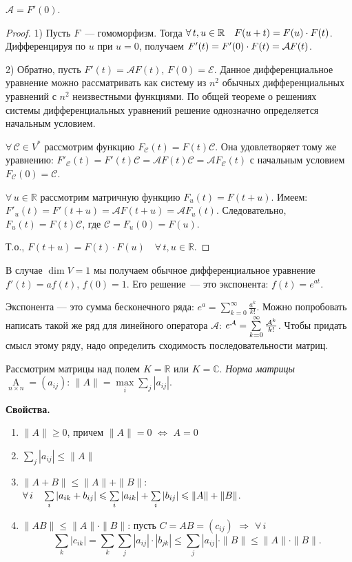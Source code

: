 \documentclass[a4paper]{article}
\newcommand{\svoy}{\vspace{5pt}\noindent\textbf{Свойства.}\vspace{-6pt}}
\newcommand*{\p}[1]{#1\nobreak\discretionary{}{\hbox{$\mathsurround=0pt #1$}}{}}
\begin{document}
\begin{zam}
$\mathcal{A}=F'(0)$.
\end{zam}

\begin{proof}
1) Пусть $F$~--- гомоморфизм. Тогда $\forall \,
t,u\in\mathbb{R}\quad F(u\p+t)=F(u)\cdot F(t)$. Дифференцируя по $u$
при $u=0$, получаем $F'(t)\p=F'(0)\cdot F(t)=\mathcal{A} F(t)$.

2) Обратно, пусть $F'(t)=\mathcal{A}F(t)$, $F(0)=\mathcal{E}$.
Данное дифференциальное уравнение можно рассматривать как систему из
$n^2$ обычных дифференциальных уравнений с $n^2$ неизвестными
функциями. По общей теореме о решениях системы дифференциальных
уравнений решение однозначно определяется начальным условием.

$\forall \, \mathcal{C}\in V^*$ рассмотрим функцию
$F_\mathcal{C}(t)=F(t)\mathcal{C}$. Она удовлетворяет тому же
уравнению:
$F'_\mathcal{C}(t)=F'(t)\mathcal{C}=\mathcal{A}F(t)\mathcal{C}=\mathcal{A}F_\mathcal{C}(t)$
с начальным условием $F_\mathcal{C}(0)=\mathcal{C}$.

$\forall \, u\in \mathbb{R}$ рассмотрим матричную функцию
$F_u(t)=F(t+u)$. Имеем:
$F'_u(t)=F'(t+u)=\mathcal{A}F(t+u)=\mathcal{A}F_u(t)$.
Следовательно, $F_u(t)=F(t)\mathcal{C}$, где
$\mathcal{C}=F_u(0)=F(u)$.

Т.о., $F(t+u)=F(t)\cdot F(u)\quad \forall \, t,u\in \mathbb{R}$.
\end{proof}

В случае $\dim V=1$ мы получаем обычное дифференциальное уравнение
$f'(t)=af(t)$, $f(0)=1$. Его решение~--- это экспонента:
$f(t)=e^{at}$.

Экспонента --- это сумма бесконечного ряда:
$e^a=\sum\limits_{k=0}^\infty \frac{a^k}{k!}$. Можно попробовать
написать такой же ряд для линейного оператора $\mathcal{A}$:
$e^\mathcal{A}\p=\sum\limits_{k=0}^\infty \frac{\mathcal{A}^k}{k!}$.
Чтобы придать смысл этому ряду, надо определить сходимость
последовательности матриц.

Рассмотрим матрицы над полем $K=\mathbb{R}$ или $K=\mathbb{C}$.
\emph{Норма матрицы} $\mathop{A}\limits_{n\times n}=(a_{ij})$: $\|
A\|= \max\limits_i\sum\limits_j |a_{ij}|$.

\svoy
\begin{enumerate}
  \item $\|A\|\geqslant 0$, причем $\|A\|=0$ $\Leftrightarrow$ $A=0$
  \item $\sum\limits_j|a_{ij}|\leqslant \|A\|$
  \item $\|A+B\|\leqslant \|A\|+\|B\|$: $\forall \, i\quad \sum\limits_i
  |a_{ik}+b_{ij}|\leqslant \sum\limits_i|a_{ik}|+\sum\limits_i|b_{ij}|\leqslant
  \|A\|\p+\|B\|$.
  \item $\|AB\|\leqslant \|A\|\cdot \|B\|$: пусть $C=AB=(c_{ij})$
  $\Rightarrow$ $\forall \, i$ $$\sum\limits_k|c_{ik}|=\sum\limits_k\sum
  \limits_j|a_{ij}|\cdot|b_{jk}|\leqslant \sum\limits_j|a_{ij}|\cdot \|B\|\leqslant
  \|A\|\cdot\|B\|.$$
\end{enumerate}
\end{document}
